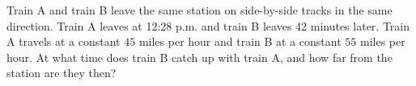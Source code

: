 Train A and train B leave the same station on side-by-side tracks in the same direction. Train A leaves at 12:28 p.m. and train B leaves $42$ minutes later. Train A travels at a constant $45$ miles per hour and train B at a constant $55$ miles per hour. At what time does train B catch up with train A, and how far from the station are they then?
